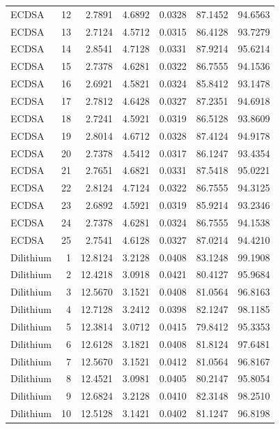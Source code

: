 \documentclass[11pt,a4paper]{article}
\begin{document}
{\begin{longtable}{l r r r r r r}
ECDSA     & 12 &    2.7891 & 4.6892 & 0.0328 & 87.1452 &    94.6563 \\
ECDSA     & 13 &    2.7124 & 4.5712 & 0.0315 & 86.4128 &    93.7279 \\
ECDSA     & 14 &    2.8541 & 4.7128 & 0.0331 & 87.9214 &    95.6214 \\
ECDSA     & 15 &    2.7378 & 4.6281 & 0.0322 & 86.7555 &    94.1536 \\
ECDSA     & 16 &    2.6921 & 4.5821 & 0.0324 & 85.8412 &    93.1478 \\
ECDSA     & 17 &    2.7812 & 4.6428 & 0.0327 & 87.2351 &    94.6918 \\
ECDSA     & 18 &    2.7241 & 4.5921 & 0.0319 & 86.5128 &    93.8609 \\
ECDSA     & 19 &    2.8014 & 4.6712 & 0.0328 & 87.4124 &    94.9178 \\
ECDSA     & 20 &    2.7378 & 4.5412 & 0.0317 & 86.1247 &    93.4354 \\
ECDSA     & 21 &    2.7651 & 4.6821 & 0.0331 & 87.5418 &    95.0221 \\
ECDSA     & 22 &    2.8124 & 4.7124 & 0.0322 & 86.7555 &    94.3125 \\
ECDSA     & 23 &    2.6892 & 4.5921 & 0.0319 & 85.9214 &    93.2346 \\
ECDSA     & 24 &    2.7378 & 4.6281 & 0.0324 & 86.7555 &    94.1538 \\
ECDSA     & 25 &    2.7541 & 4.6128 & 0.0327 & 87.0214 &    94.4210 \\
\midrule
Dilithium &  1 &   12.8124 & 3.2128 & 0.0408 & 83.1248 &    99.1908 \\
Dilithium &  2 &   12.4218 & 3.0918 & 0.0421 & 80.4127 &    95.9684 \\
Dilithium &  3 &   12.5670 & 3.1521 & 0.0408 & 81.0564 &    96.8163 \\
Dilithium &  4 &   12.7128 & 3.2412 & 0.0398 & 82.1247 &    98.1185 \\
Dilithium &  5 &   12.3814 & 3.0712 & 0.0415 & 79.8412 &    95.3353 \\
Dilithium &  6 &   12.6128 & 3.1821 & 0.0408 & 81.8124 &    97.6481 \\
Dilithium &  7 &   12.5670 & 3.1521 & 0.0412 & 81.0564 &    96.8167 \\
Dilithium &  8 &   12.4521 & 3.0981 & 0.0405 & 80.2147 &    95.8054 \\
Dilithium &  9 &   12.6824 & 3.2128 & 0.0410 & 82.3148 &    98.2510 \\
Dilithium & 10 &   12.5128 & 3.1421 & 0.0402 & 81.1247 &    96.8198 \\

\end{longtable}}
\end{document}
